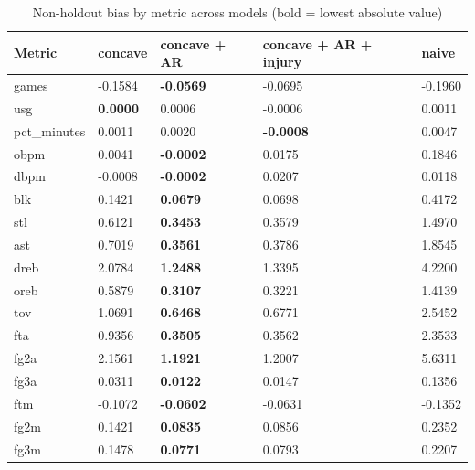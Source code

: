 \begin{table}
\caption{Non-holdout bias by metric across models (bold = lowest absolute value)}
\label{tab:non_holdout_bias_all_models}
\begin{tabular}{lllll}
\toprule
Metric & concave & concave + AR & concave + AR + injury & naive \\
\midrule
games & -0.1584 & \textbf{-0.0569} & -0.0695 & -0.1960 \\
usg & \textbf{0.0000} & 0.0006 & -0.0006 & 0.0011 \\
pct_minutes & 0.0011 & 0.0020 & \textbf{-0.0008} & 0.0047 \\
obpm & 0.0041 & \textbf{-0.0002} & 0.0175 & 0.1846 \\
dbpm & -0.0008 & \textbf{-0.0002} & 0.0207 & 0.0118 \\
blk & 0.1421 & \textbf{0.0679} & 0.0698 & 0.4172 \\
stl & 0.6121 & \textbf{0.3453} & 0.3579 & 1.4970 \\
ast & 0.7019 & \textbf{0.3561} & 0.3786 & 1.8545 \\
dreb & 2.0784 & \textbf{1.2488} & 1.3395 & 4.2200 \\
oreb & 0.5879 & \textbf{0.3107} & 0.3221 & 1.4139 \\
tov & 1.0691 & \textbf{0.6468} & 0.6771 & 2.5452 \\
fta & 0.9356 & \textbf{0.3505} & 0.3562 & 2.3533 \\
fg2a & 2.1561 & \textbf{1.1921} & 1.2007 & 5.6311 \\
fg3a & 0.0311 & \textbf{0.0122} & 0.0147 & 0.1356 \\
ftm & -0.1072 & \textbf{-0.0602} & -0.0631 & -0.1352 \\
fg2m & 0.1421 & \textbf{0.0835} & 0.0856 & 0.2352 \\
fg3m & 0.1478 & \textbf{0.0771} & 0.0793 & 0.2207 \\
\bottomrule
\end{tabular}
\end{table}
